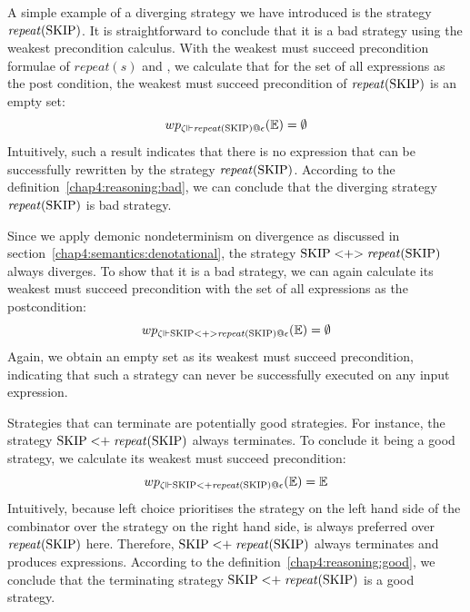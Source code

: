 A simple example of a diverging strategy we have introduced is the strategy $\mathit{repeat}(\text{SKIP})$. It is straightforward to conclude that it is a bad strategy using the weakest precondition calculus. With the weakest must succeed precondition formulae of $\mathit{repeat}(s)$ and \sskip, we calculate that for the set of all expressions as the post condition, the weakest must succeed precondition of $\mathit{repeat}(\text{SKIP})$ is an empty set:
\[wp_{\zeta\Vdash \mathit{repeat}(\text{SKIP})@\epsilon}(\mathbb{E}) = \emptyset\]
Intuitively, such a result indicates that there is no expression that can be successfully rewritten by the strategy $\mathit{repeat}(\text{SKIP})$. According to the definition~\ref{chap4:reasoning:bad}, we can conclude that the diverging strategy $\mathit{repeat}(\text{SKIP})$ is bad strategy.

Since we apply demonic nondeterminism on divergence as discussed in section~\ref{chap4:semantics:denotational}, the strategy $\text{SKIP} <\mathrel{\mathop+}\mathrel{\mathop>} \mathit{repeat}(\text{SKIP})$ always diverges. To show that it is a bad strategy, we can again calculate its weakest must succeed precondition with the set of all expressions as the postcondition:
\[wp_{\zeta\Vdash \text{SKIP} <\mathrel{\mathop+}\mathrel{\mathop>} \mathit{repeat}(\text{SKIP})@\epsilon}(\mathbb{E}) = \emptyset\]
Again, we obtain an empty set as its weakest must succeed precondition, indicating that such a strategy can never be successfully executed on any input expression.

Strategies that can terminate are potentially good strategies. For instance, the strategy $\text{SKIP} <\mathrel{\mathop+} \mathit{repeat}(\text{SKIP})$ always terminates. To conclude it being a good strategy, we calculate its weakest must succeed precondition:
\[wp_{\zeta \Vdash \text{SKIP} <\mathrel{\mathop+} \mathit{repeat}(\text{SKIP})@\epsilon}(\mathbb{E}) = \mathbb{E}\]
Intuitively, because left choice prioritises the strategy on the left hand side of the combinator over the strategy on the right hand side, \sskip is always preferred over $\mathit{repeat}(\text{SKIP})$ here. Therefore, $\text{SKIP} <\mathrel{\mathop+} \mathit{repeat}(\text{SKIP})$ always terminates and produces expressions. According to the definition~\ref{chap4:reasoning:good}, we conclude that the terminating strategy $\text{SKIP} <\mathrel{\mathop+} \mathit{repeat}(\text{SKIP})$ is a good strategy.

